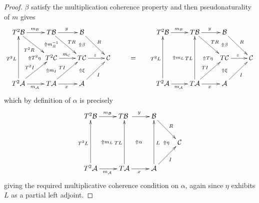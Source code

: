 \documentclass[a4paper,oneside,english]{amsart}
\numberwithin{equation}{section}
\numberwithin{figure}{section}
\theoremstyle{plain}
\theoremstyle{definition}
\theoremstyle{remark}
\theoremstyle{definition}
\theoremstyle{plain}
\theoremstyle{plain}
\theoremstyle{plain}
\begin{document}
\begin{proof}
$\beta$ satisfy the multiplication coherence property and then pseudonaturality
of $m$ gives 
\[
\xymatrix{T^{2}\mathcal{B}\ar[r]^{m_{\mathcal{B}}}\ar[dr]_{T^{2}R}\ar@{}[ddr]|-{\Uparrow T^{2}\eta} & T\mathcal{B}\ar[r]^{y}\ar[dr]^{TR}\ar@{}[d]|-{\Uparrow m_{R}^{-1}} & \mathcal{B}\ar[rd]^{R}\ar@{}[d]|-{\Uparrow\beta} &  &  & T^{2}\mathcal{B}\ar[r]^{m_{\mathcal{B}}}\ar@{}[ddr]|-{\Uparrow m_{L}} & T\mathcal{B}\ar[r]^{y}\ar[dr]^{TR} & \mathcal{B}\ar[rd]^{R}\ar@{}[d]|-{\Uparrow\beta}\\
 & T^{2}\mathcal{C}\ar[r]^{m_{\mathcal{C}}}\ar@{}[d]|-{\Uparrow m_{I}} & T\mathcal{C}\ar[r]^{z}\ar@{}[d]|-{\Uparrow\xi} & \mathcal{C} & = &  & \;\ar@{}[r]|-{\Uparrow T\eta} & T\mathcal{C}\ar[r]^{z}\ar@{}[d]|-{\Uparrow\xi} & \mathcal{C}\\
T^{2}\mathcal{A}\ar[uu]^{T^{2}L}\ar[r]_{m_{\mathcal{A}}}\ar[ru]^{T^{2}I} & T\mathcal{A}\ar[r]_{x}\ar[ur]^{TI} & \mathcal{A}\ar[ur]_{I} &  &  & T^{2}\mathcal{A}\ar[uu]^{T^{2}L}\ar[r]_{m_{\mathcal{A}}} & T\mathcal{A}\ar[r]_{x}\ar[ur]^{TI}\ar[uu]^{TL} & \mathcal{A}\ar[ur]_{I}
}
\]
which by definition of $\alpha$ is precisely
\[
\xymatrix{T^{2}\mathcal{B}\ar[r]^{m_{\mathcal{B}}}\ar@{}[ddr]|-{\Uparrow m_{L}} & T\mathcal{B}\ar[r]^{y}\;\ar@{}[rdd]|-{\Uparrow\alpha} & \mathcal{B}\ar[rd]^{R}\\
 &  & \;\ar@{}[r]|-{\Uparrow\eta} & \mathcal{C}\\
T^{2}\mathcal{A}\ar[uu]^{T^{2}L}\ar[r]_{m_{\mathcal{A}}} & T\mathcal{A}\ar[r]_{x}\ar[uu]^{TL} & \mathcal{A}\ar[uu]_{L}\ar[ur]_{I}
}
\]
giving the required multiplicative coherence condition on $\alpha$,
again since $\eta$ exhibits $L$ as a partial left adjoint.


\end{proof}
\end{document}
